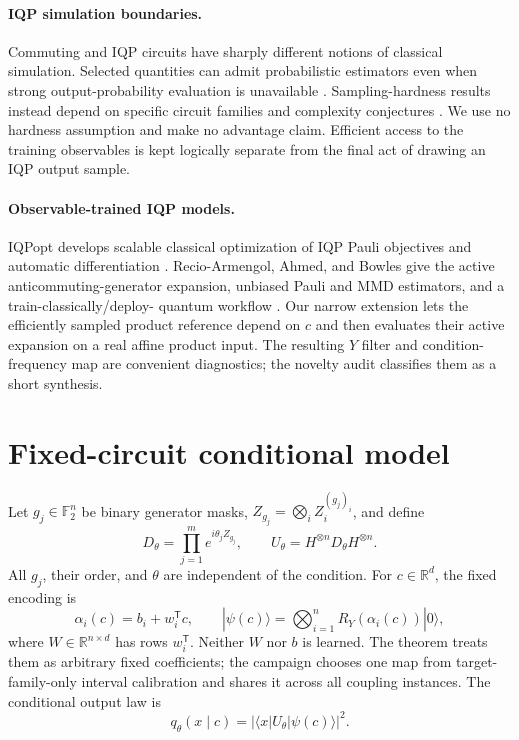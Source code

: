 \documentclass[a4paper,twocolumn,11pt,unpublished]{quantumarticle}
\newcommand{\Ftwo}{\mathbb{F}_2}
\begin{document}
\paragraph{IQP simulation boundaries.}
Commuting and IQP circuits have sharply different notions of classical
simulation.  Selected quantities can admit probabilistic estimators even when
strong output-probability evaluation is unavailable
\cite{nestSimulatingQuantumComputers2011,
niCommutingQuantumCircuits2012}.  Sampling-hardness results instead depend on
specific circuit families and complexity conjectures
\cite{bremnerClassicalSimulation2011,bremnerAverageCase2016}.  We use no
hardness assumption and make no advantage claim.  Efficient access to the
training observables is kept logically separate from the final act of drawing
an IQP output sample.

\paragraph{Observable-trained IQP models.}
IQPopt develops scalable classical optimization of IQP Pauli objectives and
automatic differentiation \cite{recio-armengolIQPoptFastOptimization2025}.
Recio-Armengol, Ahmed, and Bowles give the active anticommuting-generator
expansion, unbiased Pauli and MMD estimators, and a train-classically/deploy-
quantum workflow \cite{recio-armengolTrainClassicalDeploy2026}.  Our narrow
extension lets the efficiently sampled product reference depend on $c$ and
then evaluates their active expansion on a real affine product input.  The
resulting $Y$ filter and condition-frequency map are convenient diagnostics;
the novelty audit classifies them as a short synthesis.

\section{Fixed-circuit conditional model}
\label{sec:model}

Let $g_j\in\Ftwo^n$ be binary generator masks,
$Z_{g_j}=\bigotimes_iZ_i^{(g_j)_i}$, and define
\begin{equation}
 D_\theta=\prod_{j=1}^{m}e^{i\theta_jZ_{g_j}},\qquad
 U_\theta=H^{\otimes n}D_\theta H^{\otimes n}.
 \label{eq:iqp}
\end{equation}
All $g_j$, their order, and $\theta$ are independent of the condition.  For
$c\in\mathbb R^d$, the fixed encoding is
\begin{equation}
 \alpha_i(c)=b_i+w_i^\mathsf{T}c,\qquad
 |\psi(c)\rangle=\bigotimes_{i=1}^{n}R_Y(\alpha_i(c))|0\rangle,
 \label{eq:encoding}
\end{equation}
where $W\in\mathbb R^{n\times d}$ has rows $w_i^\mathsf{T}$.  Neither $W$ nor
$b$ is learned.  The theorem treats them as arbitrary fixed coefficients; the
campaign chooses one map from target-family-only interval calibration and
shares it across all coupling instances.  The conditional output law is
\begin{equation}
 q_\theta(x\mid c)=|\langle x|U_\theta|\psi(c)\rangle|^2.
\end{equation}
\end{document}
